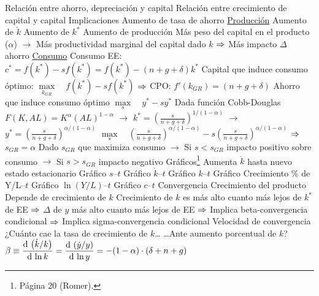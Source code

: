 \documentclass{nuevotema}
\begin{document}
\begin{esquemal}
				\4[] Relación entre ahorro, depreciación y capital
				\4[] 
				\4[] Relación entre crecimiento de capital y capital
				\4[] 
		\2 Implicaciones
			\3 Aumento de tasa de ahorro
				\4 \underline{Producción}
				\4[] Aumento de $\dot{k}$
				\4[] Aumento de $k^*$
				\4[] Aumento de producción
				\4[] Más peso del capital en el producto ($\alpha$)
				\4[] $\to$ Más productividad marginal del capital dado $k$
				\4[] $\Rightarrow$ Más impacto $\Delta$ ahorro
				\4 \underline{Consumo}
				\4[] Consumo EE:
				\4[] $c^* = f(k^*) - sf(k^*)=f(k^*)-(n+g+\delta)k^*$
				\4[] Capital que induce consumo óptimo:
				\4[] $\underset{k_{GR}}{\max} \quad f(k^*) - sf(k^*)$
				\4[] $\Rightarrow$ CPO: \quad $f'(k_{GR}) = (n+g+\delta)$
				\4[] Ahorro que induce consumo óptimo
				\4[] $\underset{s}{\max} \quad y^* - s y^*$
				\4[] Dada función Cobb-Douglas $F(K,AL) = K^\alpha (AL)^{1-\alpha}$
				\4[] $\to$ $k^* = \left( \frac{s}{n+g+\delta} \right)^{1/(1-\alpha)}$
				\4[] $\to$ $y^* = \left( \frac{s}{n+g+\delta} \right)^{\alpha/(1-\alpha)}$
				\4[] $\underset{s}{\max} \quad \left( \frac{s}{n+g+\delta} \right)^{\alpha/(1-\alpha)} - s \left( \frac{s}{n+g+\delta} \right)^{\alpha/(1-\alpha)}$
				\4[] $\Rightarrow$ $s_{GR} = \alpha$
				\4[] Dado $s_{GR}$ que maximiza consumo
				\4[] $\to$ Si $s<s_{GR}$ impacto positivo sobre consumo
				\4[] $\to$ Si $s>s_{GR}$ impacto negativo
				\4 {Gráficos}\footnote{Página 20 (Romer).}
				\4[] Aumenta $\dot{k}$ hasta nuevo estado estacionario
				\4[] 
				\4[] Gráfico $s$--$t$
				\4[] 
				\4[] Gráfico $\dot{k}$--$t$
				\4[] 
				\4[] Gráfico $k$--$t$
				\4[] 
				\4[] Gráfico Crecimiento \% de Y/L--$t$
				\4[] 
				\4[] Gráfico $\ln(Y/L)$--$t$
				\4[] 
				\4[] Gráfico $c$--$t$
				\4[] 
			\3 Convergencia
				\4 Crecimiento del producto
				\4[] Depende de crecimiento de $k$
				\4[] Crecimiento de $k$ es más alto cuanto más lejos de $k^*$ de EE
				\4[] $\Rightarrow$ $\Delta$ de $y$ más alto cuanto más lejos de EE
				\4[] $\Rightarrow$ Implica beta-convergencia condicional
				\4[] $\Rightarrow$ Implica sigma-convergencia condicional
				\4 Velocidad de convergencia
				\4[] ¿Cuánto cae la tasa de crecimiento de $k$\ldots
				\4[] \ldots Ante aumento porcentual de $k$?
				\4[] $\beta \equiv \dfrac{\text{d} \, \left( \dot{k}/k \right)}{\text{d} \, \ln k} = \dfrac{\text{d} \, \left( \dot{y}/y \right) }{\text{d} \, \ln y} = -(1-\alpha) \cdot (\delta + n + g)$

\end{esquemal}
\end{document}
